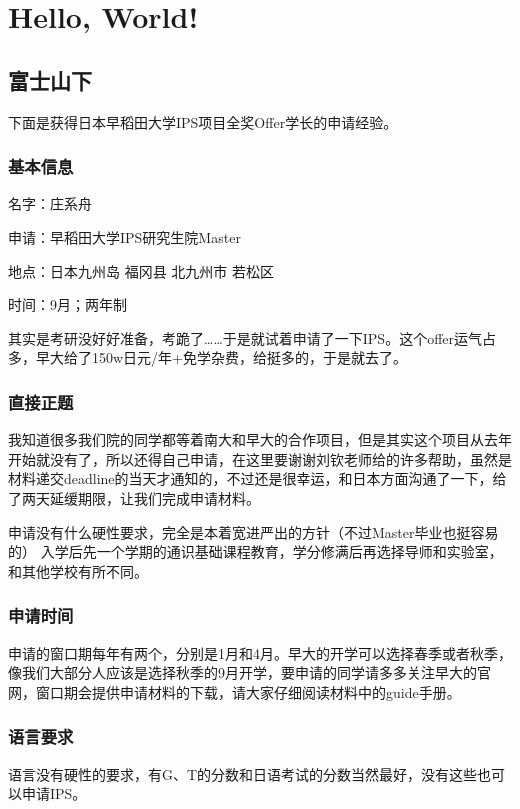 \chapter{Hello, World!}
\newpage
\section{富士山下}
下面是获得日本早稻田大学IPS项目全奖Offer学长的申请经验。\par
\subsection{基本信息}
名字：庄系舟\par
申请：早稻田大学IPS研究生院Master\par
地点：日本九州岛 福冈县 北九州市 若松区\par
时间：9月；两年制\par
其实是考研没好好准备，考跪了……于是就试着申请了一下IPS。这个offer运气占多，早大给了150w日元/年+免学杂费，给挺多的，于是就去了。\par

\subsection{直接正题}
我知道很多我们院的同学都等着南大和早大的合作项目，但是其实这个项目从去年开始就没有了，所以还得自己申请，在这里要谢谢刘钦老师给的许多帮助，虽然是材料递交deadline的当天才通知的，不过还是很幸运，和日本方面沟通了一下，给了两天延缓期限，让我们完成申请材料。\par
申请没有什么硬性要求，完全是本着宽进严出的方针（不过Master毕业也挺容易的）
入学后先一个学期的通识基础课程教育，学分修满后再选择导师和实验室，和其他学校有所不同。\par

\subsection{申请时间}
申请的窗口期每年有两个，分别是1月和4月。早大的开学可以选择春季或者秋季，像我们大部分人应该是选择秋季的9月开学，要申请的同学请多多关注早大的官网，窗口期会提供申请材料的下载，请大家仔细阅读材料中的guide手册。

\subsection{语言要求}
语言没有硬性的要求，有G、T的分数和日语考试的分数当然最好，没有这些也可以申请IPS。

